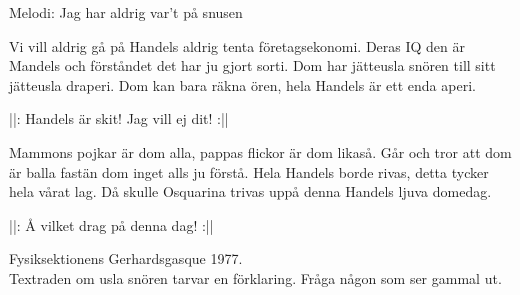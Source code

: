\begin{song}

\begin{songmeta}
Melodi: Jag har aldrig var't på snusen
\end{songmeta}

\begin{songtext}
Vi vill aldrig gå på Handels
aldrig tenta företagsekonomi.
Deras IQ den är Mandels
och förståndet det har ju gjort sorti.
Dom har jätteusla snören
till sitt jätteusla draperi.
Dom kan bara räkna ören,
hela Handels är ett enda aperi.

||: Handels är skit! \textendash{} Jag vill ej dit! :||

Mammons pojkar är dom alla,
pappas flickor är dom likaså.
Går och tror att dom är balla
fastän dom inget alls ju förstå.
Hela Handels borde rivas,
detta tycker hela vårat lag.
Då skulle Osquarina trivas
uppå denna Handels ljuva domedag.

||: Å vilket drag \textendash{} på denna dag! :||
\end{songtext}

\begin{songnotes}
Fysiksektionens Gerhardsgasque 1977.\\
Textraden om usla snören tarvar en förklaring. Fråga någon som ser gammal ut.
\end{songnotes}

\end{song}
